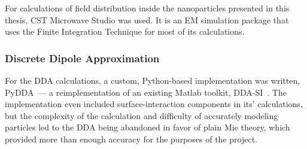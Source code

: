         For calculations of field distribution inside the nanoparticles presented in this thesis, CST Microwave Studio was used.
        It is an  EM simulation package that uses the Finite Integration Technique for most of its calculations.

        \subsubsection{Discrete Dipole Approximation}
        \label{subsec:DDA}

                For the DDA calculations, a custom, Python-based implementation was written, PyDDA~--- a reimplementation of an existing
            Matlab toolkit, DDA-SI~\cite{loke2011discrete}. The implementation even included surface-interaction components in its' calculations,
            but the complexity of the calculation and difficulty of accurately modeling particles led to the DDA being abandoned in favor of plain
            Mie theory, which provided more than enough accuracy for the purposes of the project.

